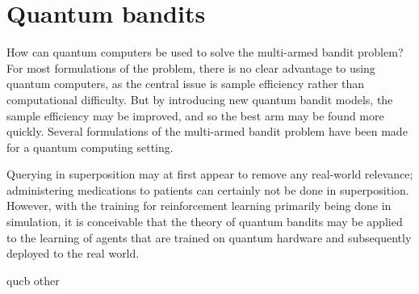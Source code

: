 \chapter{Quantum bandits}
\label{chap:qbandits}

How can quantum computers be used to solve the multi-armed bandit problem?
For most formulations of the problem, there is no clear advantage to using quantum computers, as the central issue is sample efficiency rather than computational difficulty.
But by introducing new quantum bandit models, the sample efficiency may be improved, and so the best arm may be found more quickly.
Several formulations of the multi-armed bandit problem have been made for a quantum computing setting.

Querying in superposition may at first appear to remove any real-world relevance; administering medications to patients can certainly not be done in superposition.
However, with the training for reinforcement learning primarily being done in simulation, it is conceivable that the theory of quantum bandits may be applied to the learning of agents that are trained on quantum hardware and subsequently deployed to the real world.

{qucb}
{other}
